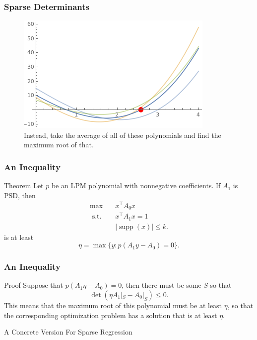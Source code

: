 \documentclass{beamer}
\DeclareMathOperator*{\supp}{supp}
\newcommand{\st}{{\text{ s.t. }}}
\begin{document}
\begin{frame}
    \frametitle{Sparse Determinants}
    \begin{figure}[h]
        \centering
        \includegraphics[width=0.6\linewidth]{univariates_average_root.png}
        \caption{Instead, take the average of all of these polynomials and find the maximum root of that.}%
        \label{fig:variety}
    \end{figure}
\end{frame}
\begin{frame}
    \frametitle{An Inequality}
    \begin{block}{Theorem}
        Let $p$ be an LPM polynomial with nonnegative coefficients.  If $A_1$ is PSD, then
        \begin{equation*}
            \begin{aligned}
                \max\quad & x^{\intercal}A_0x\\
                \st & x^{\intercal}A_1x = 1\\
                    &|\supp(x)| \le k.
            \end{aligned}
        \end{equation*}
        is at least 
        \[
            \eta = \max \{y : p(A_1y-A_0) = 0 \}.
        \]
    \end{block}
\end{frame}
\begin{frame}
    \frametitle{An Inequality}
    \begin{block}{Proof}
        Suppose that $p(A_1 \eta-A_0) = 0$, then there must be some $S$ so that 
        \[
            \det(\eta A_1|_S - A_0|_S) \le 0.
        \]
        This means that the maximum root of this polynomial must be at least $\eta$, so that the corresponding optimization problem has a solution that is at least $\eta$.
    \end{block}
\end{frame}
\begin{frame}
    \centering
    \huge
    {\color{gray}A Concrete Version For Sparse Regression}
\end{frame}
\end{document}
